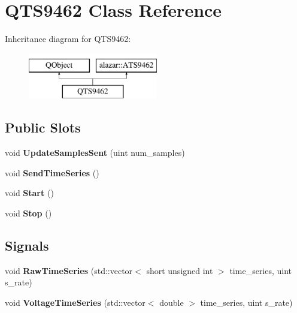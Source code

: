 \hypertarget{class_q_t_s9462}{}\section{Q\+T\+S9462 Class Reference}
\label{class_q_t_s9462}
Inheritance diagram for Q\+T\+S9462\+:\begin{figure}[H]
\begin{center}
\leavevmode
\includegraphics[height=2.000000cm]{class_q_t_s9462}
\end{center}
\end{figure}
\subsection*{Public Slots}
\begin{DoxyCompactItemize}
\item 
void {\bfseries Update\+Samples\+Sent} (uint num\+\_\+samples)\hypertarget{class_q_t_s9462_a4f8594f3594d17bc620f461940b9c363}{}\label{class_q_t_s9462_a4f8594f3594d17bc620f461940b9c363}

\item 
void {\bfseries Send\+Time\+Series} ()\hypertarget{class_q_t_s9462_a8ebb7837f39380fa67e3d206de57d332}{}\label{class_q_t_s9462_a8ebb7837f39380fa67e3d206de57d332}

\item 
void {\bfseries Start} ()\hypertarget{class_q_t_s9462_a3d47467dc91daadd830b52259dde71ab}{}\label{class_q_t_s9462_a3d47467dc91daadd830b52259dde71ab}

\item 
void {\bfseries Stop} ()\hypertarget{class_q_t_s9462_af1fac33559f85b79918e7b74aecb1e0c}{}\label{class_q_t_s9462_af1fac33559f85b79918e7b74aecb1e0c}

\end{DoxyCompactItemize}
\subsection*{Signals}
\begin{DoxyCompactItemize}
\item 
void {\bfseries Raw\+Time\+Series} (std\+::vector$<$ short unsigned int $>$ time\+\_\+series, uint s\+\_\+rate)\hypertarget{class_q_t_s9462_a0c2f091b771c1737a9d217206cb3db1d}{}\label{class_q_t_s9462_a0c2f091b771c1737a9d217206cb3db1d}

\item 
void {\bfseries Voltage\+Time\+Series} (std\+::vector$<$ double $>$ time\+\_\+series, uint s\+\_\+rate)\hypertarget{class_q_t_s9462_a0b89d044f501bb3ccde93f6c95235247}{}\label{class_q_t_s9462_a0b89d044f501bb3ccde93f6c95235247}

\end{DoxyCompactItemize}
